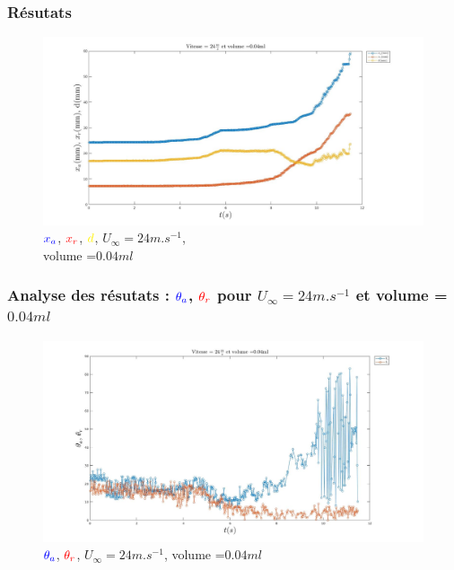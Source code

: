 \documentclass{beamer}
\begin{document}
\begin{frame}
\frametitle{Résutats}
\begin{figure}[!ht]
	\centering
		\includegraphics[width=\linewidth]{./image/v=24_vol=004_xaxrd.jpg}
		\caption{$\textcolor{blue}{x_{a}}$,
		$\textcolor{red}{x_{r}}$, $\textcolor{yellow}{d}$, 
		$U_{\infty}=24m.s^{-1}$, \\
                volume =$0.04ml$}
		\label{fig:entre_xaxrd}
		 \end{figure}
\end{frame}
\begin{frame}
\frametitle{Analyse des résutats : $\textcolor{blue}{\theta_{a}}$,
		$\textcolor{red}{\theta_{r}}$ pour $U_{\infty}=24m.s^{-1}$ et volume =$0.04ml$}
\begin{figure}[!ht]
		\includegraphics[width=\linewidth]{./image/v=24_vol=004_oaor.jpg}
		\caption{$\textcolor{blue}{\theta_{a}}$,
		$\textcolor{red}{\theta_{r}}$, $U_{\infty}=24m.s^{-1}$, volume =$0.04ml$}
		\label{fig:entre_oaor}
 \end{figure}
\end{frame}
\end{document}
